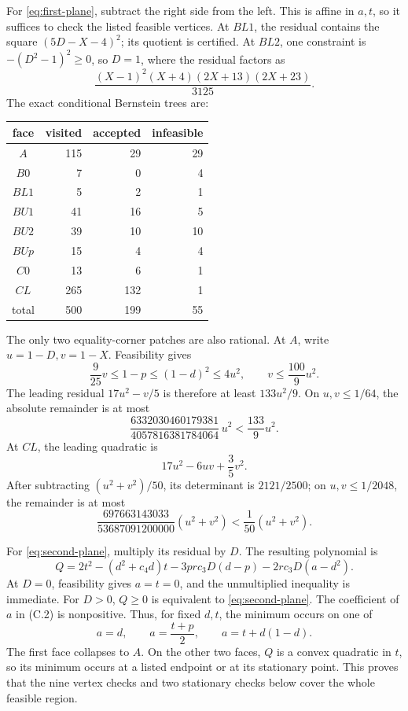 \documentclass[11pt]{article}
\begin{document}
For \eqref{eq:first-plane}, subtract the right side from the left.  This is
affine in \(a,t\), so it suffices to check the listed feasible vertices.
At \(BL1\), the residual contains the square
\((5D-X-4)^2\); its quotient is certified.  At \(BL2\), one constraint is
\(-(D^2-1)^2\geq0\), so \(D=1\), where the residual factors as
\[
 \frac{(X-1)^2(X+4)(2X+13)(2X+23)}{3125}.
\]
The exact conditional Bernstein trees are:
\begin{center}
\begin{tabular}{crrr}
\toprule
face & visited & accepted & infeasible\\
\midrule
\(A\)&115&29&29\\
\(B0\)&7&0&4\\
\(BL1\)&5&2&1\\
\(BU1\)&41&16&5\\
\(BU2\)&39&10&10\\
\(BUp\)&15&4&4\\
\(C0\)&13&6&1\\
\(CL\)&265&132&1\\
\midrule
total&500&199&55\\
\bottomrule
\end{tabular}
\end{center}
The only two equality-corner patches are also rational.  At \(A\), write
\(u=1-D,v=1-X\).  Feasibility gives
\[
 \frac{9}{25}v\leq1-p\leq(1-d)^2\leq4u^2,
 \qquad v\leq\frac{100}{9}u^2.
\]
The leading residual \(17u^2-v/5\) is therefore at least
\(133u^2/9\).  On \(u,v\leq1/64\), the absolute remainder is at most
\[
 \frac{6332030460179381}{4057816381784064}\,u^2
 <\frac{133}{9}u^2.
\]
At \(CL\), the leading quadratic is
\[
 17u^2-6uv+\frac35v^2.
\]
After subtracting \((u^2+v^2)/50\), its determinant is \(2121/2500\);
on \(u,v\leq1/2048\), the remainder is at most
\[
 \frac{697663143033}{53687091200000}(u^2+v^2)
 <\frac1{50}(u^2+v^2).
\]

For \eqref{eq:second-plane}, multiply its residual by \(D\).  The resulting
polynomial is
\begin{equation}
 Q=2t^2-(d^2+c_4d)t
 -3prc_3D(d-p)-2rc_3D(a-d^2).
 \tag{C.2}
\end{equation}
At \(D=0\), feasibility gives \(a=t=0\), and the unmultiplied inequality is
immediate.  For \(D>0\), \(Q\geq0\) is equivalent to
\eqref{eq:second-plane}.  The coefficient of \(a\) in (C.2) is
nonpositive.  Thus, for fixed \(d,t\), the minimum occurs on one of
\[
 a=d,\qquad a=\frac{t+p}{2},\qquad a=t+d(1-d).
\]
The first face collapses to \(A\).  On the other two faces, \(Q\) is a
convex quadratic in \(t\), so its minimum occurs at a listed endpoint or
at its stationary point.  This proves that the nine vertex checks and two
stationary checks below cover the whole feasible region.
\end{document}

